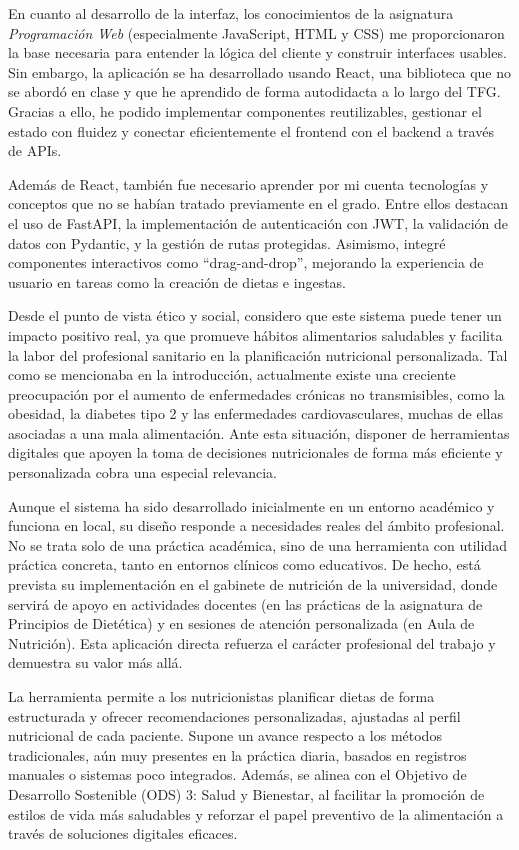 En cuanto al desarrollo de la interfaz, los conocimientos de la asignatura \textit{Programación Web} (especialmente JavaScript, HTML y CSS) me proporcionaron la base necesaria para entender la lógica del cliente y construir interfaces usables. Sin embargo, la aplicación se ha desarrollado usando React, una biblioteca que no se abordó en clase y que he aprendido de forma autodidacta a lo largo del TFG. Gracias a ello, he podido implementar componentes reutilizables, gestionar el estado con fluidez y conectar eficientemente el frontend con el backend a través de APIs.

Además de React, también fue necesario aprender por mi cuenta tecnologías y conceptos que no se habían tratado previamente en el grado. Entre ellos destacan el uso de FastAPI, la implementación de autenticación con JWT, la validación de datos con Pydantic, y la gestión de rutas protegidas. Asimismo, integré componentes interactivos como ``drag-and-drop'', mejorando la experiencia de usuario en tareas como la creación de dietas e ingestas.

Desde el punto de vista ético y social, considero que este sistema puede tener un impacto positivo real, ya que promueve hábitos alimentarios saludables y facilita la labor del profesional sanitario en la planificación nutricional personalizada. Tal como se mencionaba en la introducción, actualmente existe una creciente preocupación por el aumento de enfermedades crónicas no transmisibles, como la obesidad, la diabetes tipo 2 y las enfermedades cardiovasculares, muchas de ellas asociadas a una mala alimentación. Ante esta situación, disponer de herramientas digitales que apoyen la toma de decisiones nutricionales de forma más eficiente y personalizada cobra una especial relevancia.

Aunque el sistema ha sido desarrollado inicialmente en un entorno académico y funciona en local, su diseño responde a necesidades reales del ámbito profesional. No se trata solo de una práctica académica, sino de una herramienta con utilidad práctica concreta, tanto en entornos clínicos como educativos. De hecho, está prevista su implementación en el gabinete de nutrición de la universidad, donde servirá de apoyo en actividades docentes (en las prácticas de la asignatura de Principios de Dietética) y en sesiones de atención personalizada (en Aula de Nutrición). Esta aplicación directa refuerza el carácter profesional del trabajo y demuestra su valor más allá.

La herramienta permite a los nutricionistas planificar dietas de forma estructurada y ofrecer recomendaciones personalizadas, ajustadas al perfil nutricional de cada paciente. Supone un avance respecto a los métodos tradicionales, aún muy presentes en la práctica diaria, basados en registros manuales o sistemas poco integrados. Además, se alinea con el Objetivo de Desarrollo Sostenible (ODS) 3: Salud y Bienestar, al facilitar la promoción de estilos de vida más saludables y reforzar el papel preventivo de la alimentación a través de soluciones digitales eficaces.


